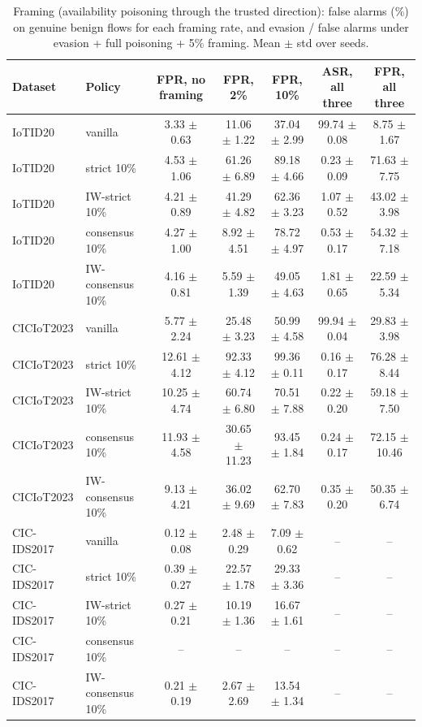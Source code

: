 \begin{table}[t]
\centering
\caption{Framing (availability poisoning through the trusted direction): false alarms (\%) on genuine benign flows for each framing rate, and evasion / false alarms under evasion + full poisoning + 5\% framing. Mean $\pm$ std over seeds.}
\label{tab:framing}
\footnotesize
\setlength{\tabcolsep}{3pt}
\begin{tabular}{llccccc}
\toprule
Dataset & Policy & FPR, no framing & FPR, 2\% & FPR, 10\% & ASR, all three & FPR, all three \\
\midrule
IoTID20 & vanilla & 3.33 $\pm$ 0.63 & 11.06 $\pm$ 1.22 & 37.04 $\pm$ 2.99 & 99.74 $\pm$ 0.08 & 8.75 $\pm$ 1.67 \\
IoTID20 & strict 10\% & 4.53 $\pm$ 1.06 & 61.26 $\pm$ 6.89 & 89.18 $\pm$ 4.66 & 0.23 $\pm$ 0.09 & 71.63 $\pm$ 7.75 \\
IoTID20 & IW-strict 10\% & 4.21 $\pm$ 0.89 & 41.29 $\pm$ 4.82 & 62.36 $\pm$ 3.23 & 1.07 $\pm$ 0.52 & 43.02 $\pm$ 3.98 \\
IoTID20 & consensus 10\% & 4.27 $\pm$ 1.00 & 8.92 $\pm$ 4.51 & 78.72 $\pm$ 4.97 & 0.53 $\pm$ 0.17 & 54.32 $\pm$ 7.18 \\
IoTID20 & IW-consensus 10\% & 4.16 $\pm$ 0.81 & 5.59 $\pm$ 1.39 & 49.05 $\pm$ 4.63 & 1.81 $\pm$ 0.65 & 22.59 $\pm$ 5.34 \\
CICIoT2023 & vanilla & 5.77 $\pm$ 2.24 & 25.48 $\pm$ 3.23 & 50.99 $\pm$ 4.58 & 99.94 $\pm$ 0.04 & 29.83 $\pm$ 3.98 \\
CICIoT2023 & strict 10\% & 12.61 $\pm$ 4.12 & 92.33 $\pm$ 4.12 & 99.36 $\pm$ 0.11 & 0.16 $\pm$ 0.17 & 76.28 $\pm$ 8.44 \\
CICIoT2023 & IW-strict 10\% & 10.25 $\pm$ 4.74 & 60.74 $\pm$ 6.80 & 70.51 $\pm$ 7.88 & 0.22 $\pm$ 0.20 & 59.18 $\pm$ 7.50 \\
CICIoT2023 & consensus 10\% & 11.93 $\pm$ 4.58 & 30.65 $\pm$ 11.23 & 93.45 $\pm$ 1.84 & 0.24 $\pm$ 0.17 & 72.15 $\pm$ 10.46 \\
CICIoT2023 & IW-consensus 10\% & 9.13 $\pm$ 4.21 & 36.02 $\pm$ 9.69 & 62.70 $\pm$ 7.83 & 0.35 $\pm$ 0.20 & 50.35 $\pm$ 6.74 \\
CIC-IDS2017 & vanilla & 0.12 $\pm$ 0.08 & 2.48 $\pm$ 0.29 & 7.09 $\pm$ 0.62 & -- & -- \\
CIC-IDS2017 & strict 10\% & 0.39 $\pm$ 0.27 & 22.57 $\pm$ 1.78 & 29.33 $\pm$ 3.36 & -- & -- \\
CIC-IDS2017 & IW-strict 10\% & 0.27 $\pm$ 0.21 & 10.19 $\pm$ 1.36 & 16.67 $\pm$ 1.61 & -- & -- \\
CIC-IDS2017 & consensus 10\% & -- & -- & -- & -- & -- \\
CIC-IDS2017 & IW-consensus 10\% & 0.21 $\pm$ 0.19 & 2.67 $\pm$ 2.69 & 13.54 $\pm$ 1.34 & -- & -- \\
\bottomrule
\end{tabular}
\end{table}
